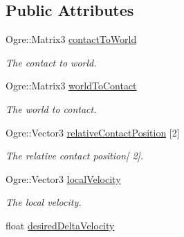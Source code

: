 \subsection*{Public Attributes}
\begin{DoxyCompactItemize}
\item 
\hypertarget{struct_physics_1_1_contact_a4e1356a728b2b89ae5d95249662cbba9}{Ogre\-::\-Matrix3 \hyperlink{struct_physics_1_1_contact_a4e1356a728b2b89ae5d95249662cbba9}{contact\-To\-World}}\label{struct_physics_1_1_contact_a4e1356a728b2b89ae5d95249662cbba9}

\begin{DoxyCompactList}\small\item\em The contact to world. \end{DoxyCompactList}\item 
\hypertarget{struct_physics_1_1_contact_ad4da46c6aaa738241a40fda166bbd8bb}{Ogre\-::\-Matrix3 \hyperlink{struct_physics_1_1_contact_ad4da46c6aaa738241a40fda166bbd8bb}{world\-To\-Contact}}\label{struct_physics_1_1_contact_ad4da46c6aaa738241a40fda166bbd8bb}

\begin{DoxyCompactList}\small\item\em The world to contact. \end{DoxyCompactList}\item 
\hypertarget{struct_physics_1_1_contact_a1731ddb712fd811e1aa0ff2fdb88e4db}{Ogre\-::\-Vector3 \hyperlink{struct_physics_1_1_contact_a1731ddb712fd811e1aa0ff2fdb88e4db}{relative\-Contact\-Position} \mbox{[}2\mbox{]}}\label{struct_physics_1_1_contact_a1731ddb712fd811e1aa0ff2fdb88e4db}

\begin{DoxyCompactList}\small\item\em The relative contact position\mbox{[} 2\mbox{]}. \end{DoxyCompactList}\item 
\hypertarget{struct_physics_1_1_contact_acdc07dc82330e56b00e7fe4b8793df56}{Ogre\-::\-Vector3 \hyperlink{struct_physics_1_1_contact_acdc07dc82330e56b00e7fe4b8793df56}{local\-Velocity}}\label{struct_physics_1_1_contact_acdc07dc82330e56b00e7fe4b8793df56}

\begin{DoxyCompactList}\small\item\em The local velocity. \end{DoxyCompactList}\item 
\hypertarget{struct_physics_1_1_contact_a3d4fddee66067fd6418c98d177f5c07a}{float \hyperlink{struct_physics_1_1_contact_a3d4fddee66067fd6418c98d177f5c07a}{desired\-Delta\-Velocity}}\label{struct_physics_1_1_contact_a3d4fddee66067fd6418c98d177f5c07a}


\end{DoxyCompactItemize}
